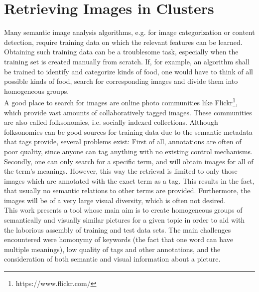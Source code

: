 \section{Retrieving Images in Clusters}
\label{sec_introduction}

Many semantic image analysis algorithms, e.g. for image categorization or content detection, require training data on which the relevant features can be learned. Obtaining such training data can be a troublesome task, especially when the training set is created manually from scratch. If, for example, an algorithm shall be trained to identify and categorize kinds of food, one would have to think of all possible kinds of food, search for corresponding images and divide them into homogeneous groups. \\
A good place to search for images are online photo communities like Flickr\footnote{https://www.flickr.com/}, which provide vast amounts of collaboratively tagged images. These communities are also called folksonomies, i.e. socially indexed collections.
Although folksonomies can be good sources for training data due to the semantic metadata that tags provide, several problems exist: First of all, annotations are often of poor quality, since anyone can tag anything with no existing control mechanisms. Secondly, one can only search for a specific term, and will obtain images for all of the term's meanings. However, this way the retrieval is limited to only those images which are annotated with the exact term as a tag. This results in the fact, that usually no semantic relations to other terms are provided. Furthermore, the images will be of a very large visual diversity, which is often not desired. \\

This work presents a tool whose main aim is to create homogeneous groups of semantically and visually similar pictures for a given topic in order to aid with the laborious assembly of training and test data sets. The main challenges encountered were homonymy of keywords (the fact that one word can have multiple meanings), low quality of tags and other annotations, and the consideration of both semantic and visual information about a picture.

